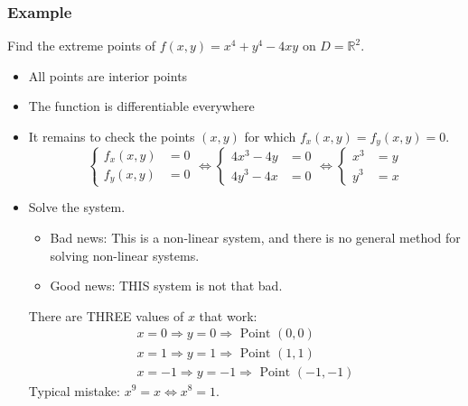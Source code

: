 \begin{frame}
  \frametitle{Example}

Find the extreme points of $f(x,y) = x^4+y^4-4xy$ on $D=\mathbb{R}^2$.

\begin{itemize}
  \item \pause  All points are interior points%
  \item \pause The function is differentiable everywhere
  \item \pause It remains to check the points $(x,y)$ for which $f_x(x,y)=f_y(x,y)=0$.
  $$\left\{ \begin{array}{ll}
    f_x(x,y) & = 0 \\
    f_y(x,y) & = 0
  \end{array}
  \right.
  \Longleftrightarrow
  \left\{ \begin{array}{ll}
    4x^3-4y & = 0 \\
    4y^3-4x & = 0
  \end{array}
  \right.
  \Longleftrightarrow
  \left\{ \begin{array}{ll}
    x^3 & = y \\
    y^3 & = x
  \end{array}
  \right. $$
  \item \pause Solve the system.
  \begin{itemize}
    \item \pause Bad news: \pause This is a non-linear system, and there is no general method for solving non-linear systems.
    \item \pause Good news: \pause THIS system is not that bad.\pause
  \end{itemize}
  There are THREE values of $x$ that work:
  \begin{align*}
    x=0 \Longrightarrow y=0 \Longrightarrow \text{ Point } (0,0)\\
    x=1 \Longrightarrow y=1 \Longrightarrow \text{ Point } (1,1) \\
    x=-1 \Longrightarrow y=-1 \Longrightarrow \text{ Point } (-1,-1)
  \end{align*}
  \pause Typical mistake: \pause $x^9 = x \Longleftrightarrow x^8=1$.
\end{itemize}
\end{frame}